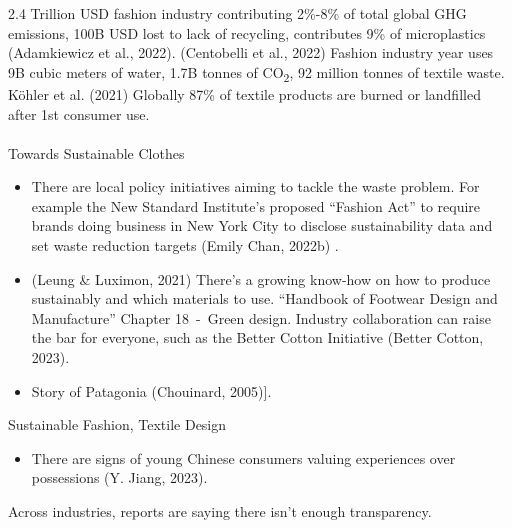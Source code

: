 \documentclass[
  letterpaper,
  DIV=11,
  numbers=noendperiod]{scrartcl}
\makeatletter
\let\oldparagraph\paragraph
\renewcommand{\paragraph}{
    \@ifstar
      \xxxParagraphStar
      \xxxParagraphNoStar
  }
\newcommand{\xxxParagraphStar}[1]{\oldparagraph*{#1}\mbox{}}
\newcommand{\xxxParagraphNoStar}[1]{\oldparagraph{#1}\mbox{}}
\providecommand{\tightlist}{%
  \setlength{\itemsep}{0pt}\setlength{\parskip}{0pt}}\usepackage{longtable,booktabs,array}
\makeatother
\begin{document}
2.4 Trillion USD fashion industry contributing 2\%-8\% of total global
GHG emissions, 100B USD lost to lack of recycling, contributes 9\% of
microplastics (Adamkiewicz et al., 2022). (Centobelli et al., 2022)
Fashion industry year uses 9B cubic meters of water, 1.7B tonnes of
CO\textsubscript{2}, 92 million tonnes of textile waste. Köhler et al.
(2021) Globally 87\% of textile products are burned or landfilled after
1st consumer use.

\paragraph{Towards Sustainable
Clothes}\label{towards-sustainable-clothes}

\begin{itemize}
\item
  There are local policy initiatives aiming to tackle the waste problem.
  For example the New Standard Institute's proposed ``Fashion Act'' to
  require brands doing business in New York City to disclose
  sustainability data and set waste reduction targets (Emily Chan,
  2022b) .
\item
  (Leung \& Luximon, 2021) There's a growing know-how on how to produce
  sustainably and which materials to use. ``Handbook of Footwear Design
  and Manufacture'' Chapter 18~-~Green design. Industry collaboration
  can raise the bar for everyone, such as the Better Cotton Initiative
  (Better Cotton, 2023).
\item
  Story of Patagonia (Chouinard, 2005){]}.
\end{itemize}

Sustainable Fashion, Textile Design

\begin{itemize}
\tightlist
\item
  There are signs of young Chinese consumers valuing experiences over
  possessions (Y. Jiang, 2023).
\end{itemize}

Across industries, reports are saying there isn't enough transparency.
\end{document}
